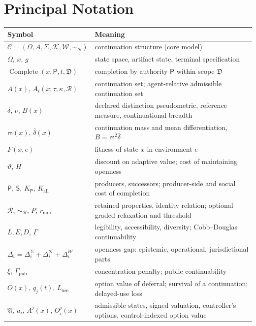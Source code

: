 \clearpage
\appendix
\section{Principal Notation}

\begin{center}
\footnotesize
\begin{tabular}{@{}ll@{}}
\toprule
Symbol & Meaning \\
\midrule
$\mathcal{C}=(\Omega,A,\Sigma,\mathcal{K},\mathcal{W},\sim_{\mathcal{R}})$ & continuation structure (core model)\\
$\Omega$, $x$, $g$ & state space, artifact state, terminal specification\\
$\operatorname{Complete}(x,\mathsf{P},t,\mathfrak{D})$ & completion by authority $\mathsf{P}$ within scope $\mathfrak{D}$\\
$A(x)$, $A_i(x;\tau,\kappa,\mathcal{R})$ & continuation set; agent-relative admissible continuation set\\
$\delta$, $\nu$, $B(x)$ & declared distinction pseudometric, reference measure, continuational breadth\\
$\mathsf{m}(x)$, $\bar\delta(x)$ & continuation mass and mean differentiation, $B=\mathsf{m}^2\bar\delta$\\
$F(x,e)$ & fitness of state $x$ in environment $e$\\
$\vartheta$, $H$ & discount on adaptive value; cost of maintaining openness\\
$\mathsf{P}$, $\mathsf{S}$, $K_{\mathsf{P}}$, $K_{\mathrm{all}}$ & producers, successors; producer-side and social cost of completion\\
$\mathcal{R}$, $\sim_{\mathcal{R}}$, $P$, $r_{\min}$ & retained properties, identity relation; optional graded relaxation and threshold\\
$L,E,D$, $\Gamma$ & legibility, accessibility, diversity; Cobb--Douglas continuability\\
$\Delta_i=\Delta_i^{\Sigma}+\Delta_i^{\mathcal{K}}+\Delta_i^{\mathcal{W}}$ & openness gap: epistemic, operational, jurisdictional parts\\
$\xi$, $\Gamma_{\mathrm{pub}}$ & concentration penalty; public continuability\\
$O(x)$, $q_j(t)$, $L_{\mathrm{use}}$ & option value of deferral; survival of a continuation; delayed-use loss\\
$\mathfrak{A}$, $u_i$, $A^j(x)$, $O_i^j(x)$ & admissible states, signed valuation, controller's options, control-indexed option value\\

\end{tabular}
\end{center}

